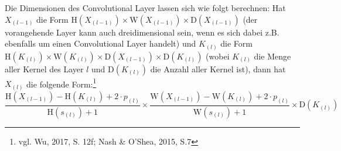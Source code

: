 \documentclass[a4paper,12pt,ngerman,oneside]{scrreprt}	%
\begin{document}
			
			
			Die Dimensionen des Convolutional Layer lassen sich wie folgt berechnen: Hat $X_{(l-1)}$ die Form $\textrm{H}({X_{(l-1)}}) \times \textrm{W}({X_{(l-1)}}) \times \textrm{D}({X_{(l-1)}})$ (der vorangehende Layer kann auch dreidimensional sein, wenn es sich dabei z.B. ebenfalls um einen Convolutional Layer handelt) und $K_{(l)}$ die Form $\textrm{H}({K_{(l)}}) \times \textrm{W}({K_{(l)}}) \times \textrm{D}({X_{(l-1)}}) \times \textrm{D}({K_{(l)}})$ (wobei $K_{(l)}$ die Menge aller Kernel des Layer $l$ und $\textrm{D}({K_{(l)}})$ die Anzahl aller Kernel ist), dann hat $X_{(l)}$ die folgende Form:\footnote{vgl. Wu, 2017, S. 12f; Nash \& O'Shea, 2015, S.7}
			\begin{equation}
			\frac{ \textrm{H}(X_{(l-1)}) - \textrm{H}(K_{(l)}) + 2 \cdot p_{(l)}}{\textrm{H}(s_{(l)})+1} \times \frac{ \textrm{W}(X_{(l-1)}) - \textrm{W}(K_{(l)}) + 2 \cdot p_{(l)}}{\textrm{W}(s_{(l)})+1} \times \textrm{D}({K_{(l)}})
			\end{equation}
			
			
\end{document}
